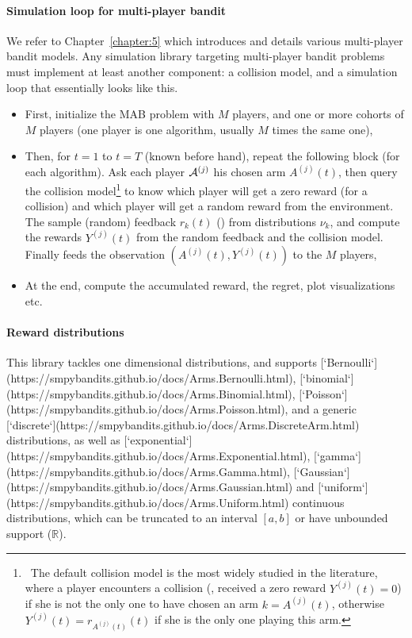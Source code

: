\paragraph{Simulation loop for multi-player bandit}
%
We refer to Chapter~\ref{chapter:5} which introduces and details various multi-player bandit models.
Any simulation library targeting multi-player bandit problems must implement at least another component:
a collision model, and a simulation loop that essentially looks like this.
\begin{itemize}
    \item First, initialize the MAB problem with $M$ players, and one or more cohorts of $M$ players (one player is one algorithm, usually $M$ times the same one),
    \item Then, for $t=1$ to $t=T$ (known before hand), repeat the following block (for each algorithm). Ask each player $\mathcal{A}^{(j)}$ his chosen arm $A^{(j)}(t)$, then query the collision model\footnote{~The default collision model is the most widely studied in the literature, where a player encounters a collision (\ie, received a zero reward $Y^{(j)}(t)=0$) if she is not the only one to have chosen an arm $k=A^{(j)}(t)$, otherwise $Y^{(j)}(t)=r_{A^{(j)}(t)}(t)$ if she is the only one playing this arm.} to know which player will get a zero reward (for a collision) and which player will get a random reward from the environment. The
    sample (random) feedback $r_k(t)$ (\iid) from distributions $\nu_{k}$, and compute the rewards $Y^{(j)}(t)$ from the random feedback and the collision model. Finally feeds the observation $(A^{(j)}(t),Y^{(j)}(t))$ to the $M$ players,
    \item At the end, compute the accumulated reward, the regret, plot visualizations etc.
\end{itemize}

\paragraph{Reward distributions}
%
This library tackles one dimensional distributions,
and supports [`Bernoulli`](https://smpybandits.github.io/docs/Arms.Bernoulli.html), [`binomial`](https://smpybandits.github.io/docs/Arms.Binomial.html), [`Poisson`](https://smpybandits.github.io/docs/Arms.Poisson.html), and a generic [`discrete`](https://smpybandits.github.io/docs/Arms.DiscreteArm.html) distributions,
as well as [`exponential`](https://smpybandits.github.io/docs/Arms.Exponential.html), [`gamma`](https://smpybandits.github.io/docs/Arms.Gamma.html), [`Gaussian`](https://smpybandits.github.io/docs/Arms.Gaussian.html) and [`uniform`](https://smpybandits.github.io/docs/Arms.Uniform.html) continuous distributions,
which can be truncated to an interval $[a,b]$ or have unbounded support ($\mathbb{R}$).


